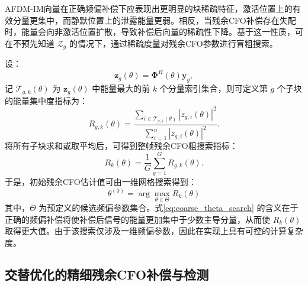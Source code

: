 AFDM-IM向量在正确频偏补偿下应表现出更明显的块稀疏特征，激活位置上的有效分量更集中，而静默位置上的泄露能量更弱。相反，当残余CFO补偿存在失配时，能量会向非激活位置扩散，导致补偿后向量的稀疏性下降。基于这一性质，可在不预先知道 $\mathcal{Z}_g$ 的情况下，通过稀疏度量对残余CFO参数进行盲粗搜索。

设：
\begin{equation}
    \mathbf{z}_g(\theta)=\boldsymbol{\Phi}^{H}(\theta)\mathbf{y}_g,
\end{equation}
记 $\mathcal{T}_{g,k}(\theta)$ 为 $\mathbf{z}_g(\theta)$ 中能量最大的前 $k$ 个分量索引集合，则可定义第 $g$ 个子块的能量集中度指标为：
\begin{equation}
    R_{g,k}(\theta)
    =
    \frac{\sum\limits_{i\in\mathcal{T}_{g,k}(\theta)}\left|z_{g,i}(\theta)\right|^2}
    {\sum\limits_{i=1}^{n}\left|z_{g,i}(\theta)\right|^2}.
    \label{eq:block_concentration_metric}
\end{equation}
将所有子块求和或取平均后，可得到整帧残余CFO粗搜索指标：
\begin{equation}
    R_k(\theta)
    =
    \frac{1}{G}
    \sum_{g=1}^{G}
    R_{g,k}(\theta).
    \label{eq:global_concentration_metric}
\end{equation}
于是，初始残余CFO估计值可由一维网格搜索得到：
\begin{equation}
    \theta^{(0)}=\arg\max_{\theta\in\Theta} R_k(\theta)
    \label{eq:coarse_theta_search}
\end{equation}
其中，$\Theta$ 为预定义的候选频偏参数集合。式\ref{eq:coarse_theta_search} 的含义在于正确的频偏补偿将使补偿后信号的能量更加集中于少数主导分量，从而使 $R_k(\theta)$ 取得更大值。由于该搜索仅涉及一维频偏参数，因此在实现上具有可控的计算复杂度。

\subsection{交替优化的精细残余CFO补偿与检测}
\label{subsec:alternating_phase_detection}

